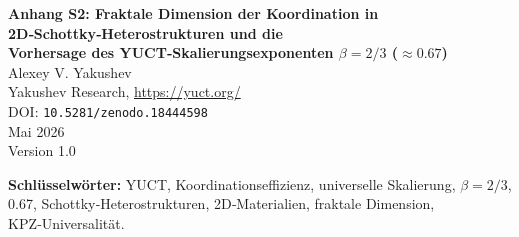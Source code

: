 \documentclass[12pt,a4paper]{article}
\begin{document}
	
	\begin{titlepage}
		\centering
		\vspace*{1cm}
		{\Huge\bfseries Anhang S2: Fraktale Dimension der Koordination in 2D‑Schottky‑Heterostrukturen und die \\ Vorhersage des YUCT‑Skalierungsexponenten $\beta = 2/3$ ($\approx 0.67$)}\\[1cm]
		{\large Alexey V. Yakushev}\\[0.3cm]
		{\normalsize Yakushev Research, \url{https://yuct.org/}}\\[1.5cm]
		{\normalsize DOI: \texttt{10.5281/zenodo.18444598}}\\[0.5cm]
		{\normalsize Mai 2026\\Version 1.0}\\[2cm]
		
		\begin{minipage}{0.9\textwidth}
			\begin{abstract}
				\noindent
				Ang, Yang und Ang (Phys. Rev. Lett. 121, 056802, 2018) entdeckten
				universelle Strom‑Temperatur‑Skalierungsgesetze in zweidimensionalen
				Schottky‑Heterostrukturen: $\log(\mathcal{I}/T^{3/2}) \propto -1/T$ für
				Lateralkontakte und $\log(\mathcal{I}/T^{1}) \propto -1/T$ für
				Vertikalkontakte mit nicht erhaltenem Impuls. In diesem Anhang zeigen wir,
				dass beide Exponenten durch die effektive fraktale Dimension $d_f$ des
				Koordinationsnetzwerks bestimmt werden, das den Transport steuert.
				Das universelle YUCT‑Fehlerskalierungsgesetz $\varepsilon = \kappa_c\alpha
				K_{\mathrm{eff}}^{-\beta}$ mit $\beta = 2/3 \approx 0.67$ ist über
				$\beta = 2/d_f$ mit $d_f$ verknüpft. Aus der experimentellen Stromskalierung
				extrahieren wir $d_f = 3$ für Lateralkontakte und $d_f = 2$ für
				Vertikalkontakte, was $\beta = 2/3$ bzw. $\beta = 1$ ergibt.
				Die Analyse sagt voraus, dass relative Stromschwankungen in lateralen
				Schottky‑Dioden $\varepsilon_{\mathrm{fluc}} \propto K_{\mathrm{eff}}^{-2/3}$
				folgen sollten – eine falsifizierbare Vorhersage, die mit Standard‑
				Rauschspektroskopie getestet werden kann. Diese Arbeit fügt 2D‑Schottky‑
				Heterostrukturen in die Familie der Systeme ein, die den universellen
				YUCT‑Exponenten $\beta = 2/3$ ($0.67$) zeigen oder voraussichtlich zeigen
				werden, und erweitert damit die Reichweite der Theorie in die Festkörper‑
				Nanoelektronik.
			\end{abstract}
			\vspace{1cm}
			\noindent\small\textbf{Schlüsselwörter:} YUCT, Koordinationseffizienz, universelle Skalierung,
			$\beta = 2/3$, 0.67, Schottky‑Heterostrukturen, 2D‑Materialien,
			fraktale Dimension, KPZ‑Universalität.
		\end{minipage}
	\end{titlepage}
	
\end{document}
